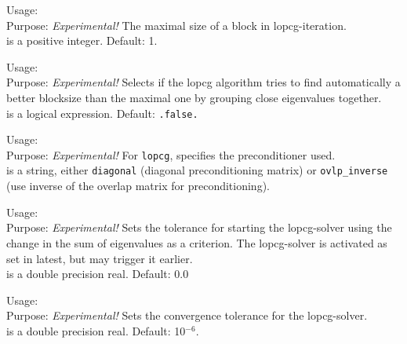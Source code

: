 {  
  \noindent
  Usage:   \\[1.0ex]
  Purpose: \emph{Experimental!} The maximal size of a block 
    in lopcg-iteration. \\[1.0ex]
   is a positive integer. Default: 1. \\
} 

{
  \noindent
  Usage:   \\[1.0ex]
  Purpose: \emph{Experimental!} Selects if the lopcg algorithm tries
    to find automatically a better blocksize than the maximal one by
    grouping close eigenvalues together. \\[1.0ex]
   is a logical expression. Default: \texttt{.false.} \\
} 

{
  \noindent
  Usage:   \\[1.0ex]
  Purpose: \emph{Experimental!} For 
    \texttt{lopcg}, specifies the preconditioner used. \\[1.0ex]
   is a string, either \texttt{diagonal} (diagonal
    preconditioning matrix) or \texttt{ovlp\_inverse} (use inverse of
    the overlap matrix for preconditioning). \\
}

{
  \noindent
  Usage:   \\[1.0ex]
  Purpose: \emph{Experimental!} Sets the tolerance for starting
    the lopcg-solver using the change in the sum of eigenvalues as a criterion.
    The lopcg-solver is activated as set in  latest, but
     may trigger it earlier. \\[1.0ex]
   is a double precision real. Default: 0.0 \\
} 

{ 
  \noindent
  Usage:   \\[1.0ex]
  Purpose: \emph{Experimental!} Sets the convergence tolerance for
    the lopcg-solver.\\[1.0ex]
   is a double precision real. Default: 10$^{-6}$. \\
} 

